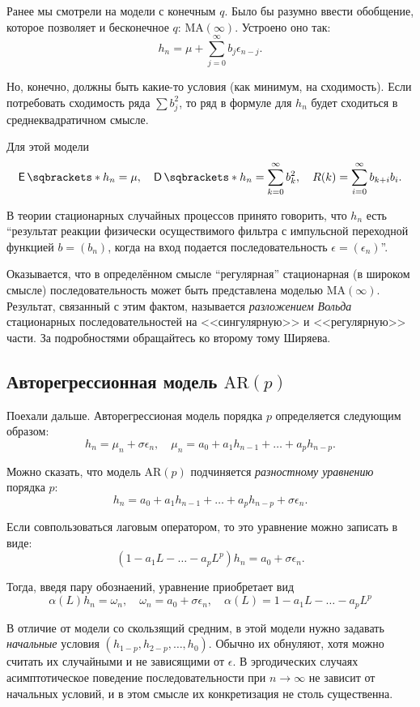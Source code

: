 Ранее мы смотрели на модели с конечным \(q\). Было бы разумно ввести обобщение, 
которое позволяет и бесконечное \(q\): \(\mathrm{MA}(\infty)\). Устроено оно 
так:
\[
	h_{n} = \mu + \sum_{j = 0}^{\infty} b_{j}\epsilon_{n - j}.
\]

Но, конечно, должны быть какие-то условия (как минимум, на сходимость). Если 
потребовать сходимость ряда \(\sum b_{j}^{2}\), то ряд в формуле для \(h_{n}\) 
будет сходиться в среднеквадратичном смысле.

Для этой модели
\[
	\E{h_{n}} = \mu, \quad \D{h_{n}} = \sum_{k = 0}^{\infty} b_{k}^{2}, \quad 
	R(k) = \sum_{i = 0}^{\infty} b_{k + i}b_{i}.
\]

В теории стационарных случайных процессов принято говорить, что \(h_{n}\) есть 
``результат реакции физически осуществимого фильтра с импульсной переходной 
функцией \(b = (b_{n})\), когда на вход подается последовательность \(\epsilon 
= (\epsilon_{n})\)''.

Оказывается, что в определённом смысле ``регулярная'' стационарная (в широком 
смысле) последовательность может быть представлена моделью 
\(\mathrm{MA}(\infty)\). Результат, связанный с этим фактом, называется 
\emph{разложением Вольда} стационарных последовательностей на <<сингулярную>> и 
<<регулярную>> части. За подробностями обращайтесь ко второму тому Ширяева.

\subsection{Авторегрессионная модель \(\mathrm{AR}(p)\)}
Поехали дальше. Авторегрессионая модель порядка \(p\) определяется следующим 
образом:
\[
	h_{n} = \mu_{n} + \sigma\epsilon_{n}, \quad \mu_{n} = a_{0} + a_{1}h_{n - 
	1} + \ldots + a_{p}h_{n - p}.
\]

Можно сказать, что модель \(\mathrm{AR}(p)\) подчиняется \emph{разностному 
уравнению} порядка \(p\):
\[
	h_{n} = a_{0} + a_{1}h_{n - 1} + \ldots + a_{p}h_{n - p} + 
	\sigma\epsilon_{n}.
\]

Если совпользоваться лаговым оператором, то это уравнение можно записать в виде:
\[
	(1 - a_{1}L - \ldots - a_{p}L^{p})h_{n} = a_{0} + \sigma\epsilon_{n}.
\]

Тогда, введя пару обознаений, уравнение приобретает вид
\[
	\alpha(L)h_{n} = \omega_{n}, \quad \omega_{n} = a_{0} + \sigma\epsilon_{n}, 
	\quad \alpha(L) = 1 - a_{1}L - \ldots - a_{p}L^{p}
\]

В отличие от модели со скользящий средним, в этой модели нужно задавать 
\emph{начальные} условия \((h_{1 - p}, h_{2 - p}, \ldots, h_{0})\). Обычно их 
обнуляют, хотя можно считать их случайными и не зависящими от \(\epsilon\). В 
эргодических случаях асимптотическое поведение последовательности при \(n \to 
\infty\) не зависит от начальных условий, и в этом смысле их конкретизация не 
столь существенна.

